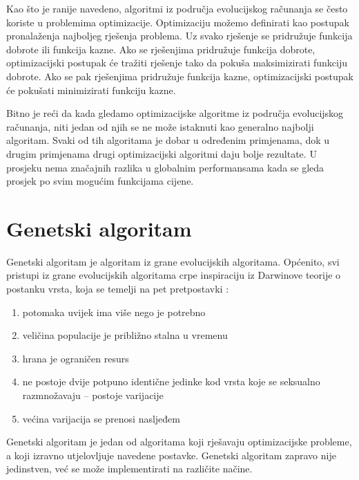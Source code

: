 \documentclass[zavrsnirad]{fer}
\begin{document}
		Kao što je ranije navedeno, algoritmi iz područja evolucijskog računanja se često koriste u problemima optimizacije. Optimizaciju možemo definirati kao postupak pronalaženja najboljeg rješenja problema. Uz svako rješenje se pridružuje funkcija dobrote ili funkcija kazne. Ako se rješenjima pridružuje funkcija dobrote, optimizacijski postupak će tražiti rješenje tako da pokuša maksimizirati funkciju dobrote. Ako se pak rješenjima pridružuje funkcija kazne, optimizacijski postupak će pokušati minimizirati funkciju kazne.\cite{skriptaEvolucijskoRacunarstvo}

		Bitno je reći da kada gledamo optimizacijske algoritme iz područja evolucijskog računanja, niti jedan od njih se ne može istaknuti kao generalno najbolji algoritam. Svaki od tih algoritama je dobar u određenim primjenama, dok u drugim primjenama drugi optimizacijski algoritmi daju bolje rezultate. U prosjeku nema značajnih razlika u globalnim performansama kada se gleda prosjek po svim mogućim funkcijama cijene.\cite{skriptaEvolucijskoRacunarstvo}
	
	\section{Genetski algoritam}
	\label{pog:Genetski algoritam}
	
		Genetski algoritam je algoritam iz grane evolucijskih algoritama. Općenito, svi pristupi iz grane evolucijskih algoritama crpe inspiraciju iz Darwinove teorije o postanku vrsta, koja se temelji na pet pretpostavki \cite{skriptaEvolucijskoRacunarstvo}:
		\begin{enumerate}
			\item potomaka uvijek ima više nego je potrebno
			\item veličina populacije je približno stalna u vremenu
			\item hrana je ograničen resurs
			\item ne postoje dvije potpuno identične jedinke kod vrsta koje se seksualno razmnožavaju -- postoje varijacije
			\item većina varijacija se prenosi nasljeđem
		\end{enumerate}
		
		Genetski algoritam je jedan od algoritama koji rješavaju optimizacijske probleme, a koji izravno utjelovljuje navedene postavke. Genetski algoritam zapravo nije jedinstven, već se može implementirati na različite načine. \cite{skriptaEvolucijskoRacunarstvo}
		
\end{document}
